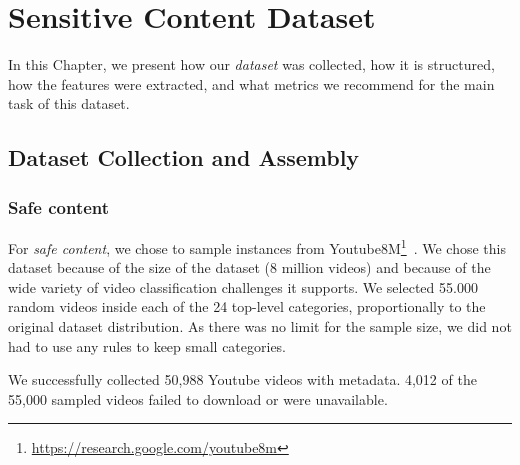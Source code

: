 \newpage

\chapter{Sensitive Content Dataset}
\label{chap:dataset}

In this Chapter, we present how our \textit{dataset} was collected, how it is structured, how the features were extracted, and what metrics we recommend for the main task of this dataset.

\section{Dataset Collection and Assembly}\label{sec:dataset-collection}




\subsection{Safe content}\label{subsec:dataset-safe}

For \textit{safe content}, we chose to sample instances from Youtube8M\footnote{\url{https://research.google.com/youtube8m}}~\cite{abu2016youtube}. We chose this dataset because of the size of the dataset (8 million videos) and because of the wide variety of video classification challenges it supports. We selected 55.000 random videos inside each of the 24 top-level categories, proportionally to the original dataset distribution. As there was no limit for the sample size, we did not had to use any rules to keep small categories. 

We successfully collected 50,988 Youtube videos with metadata. 4,012 of the 55,000 sampled videos failed to download or were unavailable. 

